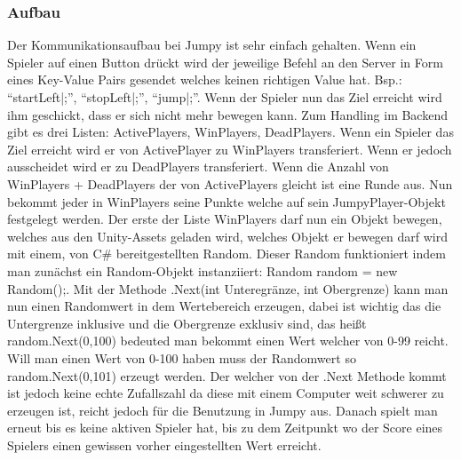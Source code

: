 \subsubsection{Aufbau}
Der Kommunikationsaufbau bei Jumpy ist sehr einfach gehalten. Wenn ein Spieler auf einen Button drückt wird der jeweilige Befehl an den Server in Form eines Key-Value Pairs gesendet welches keinen richtigen Value hat. Bsp.: “startLeft|;”, “stopLeft|;”, “jump|;”. Wenn der Spieler nun das Ziel erreicht wird ihm geschickt, dass er sich nicht mehr bewegen kann. Zum Handling im Backend gibt es drei Listen: ActivePlayers, WinPlayers, DeadPlayers. Wenn ein Spieler das Ziel erreicht wird er von ActivePlayer zu WinPlayers transferiert. Wenn er jedoch ausscheidet wird er zu DeadPlayers transferiert. Wenn die Anzahl von WinPlayers + DeadPlayers der von ActivePlayers gleicht ist eine Runde aus. Nun bekommt jeder in WinPlayers seine Punkte welche auf sein JumpyPlayer-Objekt festgelegt werden. Der erste der Liste WinPlayers darf nun ein Objekt bewegen, welches aus den Unity-Assets geladen wird, welches Objekt er bewegen darf wird mit einem, von C\# bereitgestellten Random. Dieser Random funktioniert indem man zunächst ein Random-Objekt instanziiert: Random random = new Random();. Mit der Methode .Next(int Unteregränze, int Obergrenze) kann man nun einen Randomwert in dem Wertebereich erzeugen, dabei ist wichtig das die Untergrenze inklusive und die Obergrenze exklusiv sind, das heißt random.Next(0,100) bedeuted man bekommt einen Wert welcher von 0-99 reicht. Will man einen Wert von 0-100 haben muss der Randomwert so random.Next(0,101) erzeugt werden. Der welcher von der .Next Methode kommt ist jedoch keine echte Zufallszahl da diese mit einem Computer weit schwerer zu erzeugen ist, reicht jedoch für die Benutzung in Jumpy aus. Danach spielt man erneut bis es keine aktiven Spieler hat, bis zu dem Zeitpunkt wo der Score eines Spielers einen gewissen vorher eingestellten Wert erreicht.
